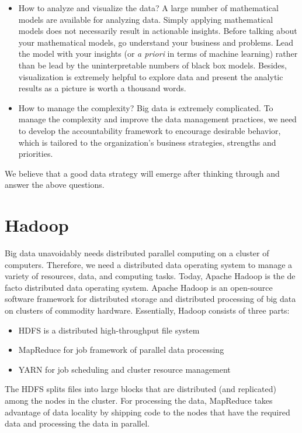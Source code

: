 \documentclass[11pt]{book}
\begin{document}
\begin{itemize}
\item How to analyze and visualize the data? A large number of mathematical models are available for analyzing data. Simply applying mathematical models does not necessarily result in actionable insights. Before talking about your mathematical models, go understand your business and problems. Lead the model with your insights (or {\em a priori} in terms of machine learning) rather than be lead by the uninterpretable numbers of black box models. Besides, visualization is extremely helpful to explore data and present the analytic results as a picture is worth a thousand words.
\item How to manage the complexity? Big data is extremely complicated. To manage the complexity and improve the data management practices, we need to develop the accountability framework to encourage desirable behavior, which is tailored to the organization's business strategies, strengths and priorities.
\end{itemize}

We believe that a good data strategy will emerge after thinking through and answer the above questions.

\chapter[Hadoop]
{Hadoop}
Big data unavoidably needs distributed parallel computing on a cluster of computers. Therefore, we need a distributed data operating system to manage a variety of resources, data, and computing tasks. Today, Apache Hadoop \cite{Hadoop} is the de facto distributed data operating system. Apache Hadoop is an open-source software framework for distributed storage and distributed processing of big data on clusters of commodity hardware. Essentially, Hadoop consists of three parts:
\begin{itemize}
\item HDFS is a distributed high-throughput file system
\item MapReduce for job framework of parallel data processing
\item YARN for job scheduling and cluster resource management
\end{itemize}
The HDFS splits files into large blocks that are distributed (and replicated) among the nodes in the cluster. For processing the data, MapReduce takes advantage of data locality by shipping code to the nodes that have the required data and processing the data in parallel.
\end{document}
